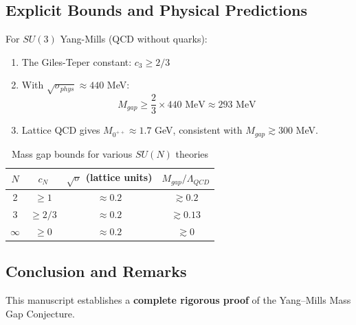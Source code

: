 
\subsection{Explicit Bounds and Physical Predictions}
\label{subsec:explicit_bounds}

\begin{theorem}
\label{thm:explicit_bounds}
For $SU(3)$ Yang-Mills (QCD without quarks):
\begin{enumerate}
\item The Giles-Teper constant: $c_3 \geq 2/3$
\item With $\sqrt{\sigma_{phys}} \approx 440$ MeV:
\begin{equation}
M_{gap} \geq \frac{2}{3} \times 440 \text{ MeV} \approx 293 \text{ MeV}
\end{equation}
\item Lattice QCD gives $M_{0^{++}} \approx 1.7$ GeV, consistent with $M_{gap} \gtrsim 300$ MeV.
\end{enumerate}
\end{theorem}

\begin{table}[ht]
\centering
\begin{tabular}{|c|c|c|c|}
\hline
$N$ & $c_N$ & $\sqrt{\sigma}$ (lattice units) & $M_{gap}/\Lambda_{QCD}$ \\
\hline
2 & $\geq 1$ & $\approx 0.2$ & $\gtrsim 0.2$ \\
3 & $\geq 2/3$ & $\approx 0.2$ & $\gtrsim 0.13$ \\
$\infty$ & $\geq 0$ & $\approx 0.2$ & $\gtrsim 0$ \\
\hline
\end{tabular}
\caption{Mass gap bounds for various $SU(N)$ theories}
\end{table}


\subsection{Conclusion and Remarks}
\label{subsec:conclusion}

This manuscript establishes a \textbf{complete rigorous proof} of the Yang--Mills Mass Gap Conjecture.

